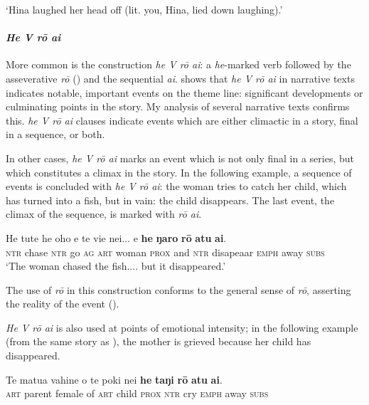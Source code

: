\glt 
‘Hina laughed her head off (lit. you, Hina, lied down laughing).’ \textstyleExampleref{[R313.025]} 
\z

\paragraph{\textit{He V rō {\ꞌ}ai}}\label{sec:7.2.3.3.2} More common is the construction \textit{he V rō {\ꞌ}ai}: a \textit{he}{}-marked verb followed by the asseverative  \textit{rō} () and the sequential  \textit{{\ꞌ}ai}. \citet[125]{WeberR2003} shows that \textit{he V rō {\ꞌ}ai} in narrative texts indicates notable, important events on the theme line: significant developments or culminating points in the story. My analysis of several narrative texts confirms this. \textit{he V rō {\ꞌ}ai} clauses indicate events which are either climactic in a story, final in a sequence, or both.

In other cases, \textit{he V rō {\ꞌ}ai} marks an event which is not only final in a series, but which constitutes a climax in the story. In the following example, a sequence of events is concluded with \textit{he V rō {\ꞌ}ai}: the woman tries to catch her child, which has turned into a fish, but in vain: the child disappears. The last event, the climax of the sequence, is marked with \textit{rō {\ꞌ}ai}.

\ea\label{ex:7.12}
\gll He tute he oho e te vi{\ꞌ}e nei... {\ꞌ}e \textbf{he} \textbf{ŋaro} \textbf{rō} \textbf{atu} \textbf{{\ꞌ}ai}.\\
\textsc{ntr} chase \textsc{ntr} go \textsc{ag} \textsc{art} woman \textsc{prox} and \textsc{ntr} disapeaar \textsc{emph} away \textsc{subs}\\

\glt
‘The woman chased the fish.... but it disappeared.’ \textstyleExampleref{[R338.009]} 
\z

The use of \textit{rō} in this construction conforms to the general sense of \textit{rō}, asserting the reality of the event ().

\textit{He V rō {\ꞌ}ai} is also used at points of emotional intensity; in the following example (from the same story as ), the mother is grieved because her child has disappeared.

\ea\label{ex:7.13}
\gll Te matu{\ꞌ}a vahine o te poki nei \textbf{he} \textbf{taŋi} \textbf{rō} \textbf{atu} \textbf{{\ꞌ}ai}.\\
\textsc{art} parent female of \textsc{art} child \textsc{prox} \textsc{ntr} cry \textsc{emph} away \textsc{subs}\\

